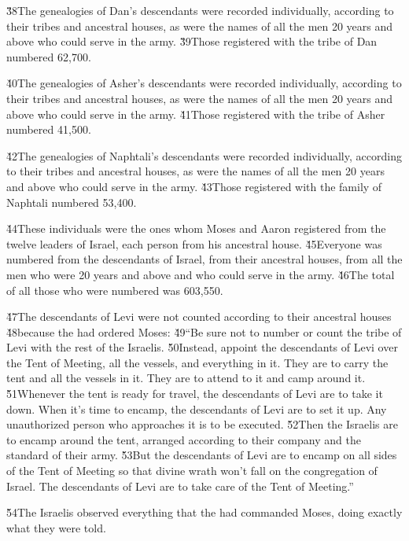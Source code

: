 \v{38}The genealogies of Dan's descendants were recorded individually, according to their tribes and ancestral houses, as were the names of all the men 20 years and above who could serve in the army. \v{39}Those registered with the tribe of Dan numbered 62,700.

\v{40}The genealogies of Asher's descendants were recorded individually, according to their tribes and ancestral houses, as were the names of all the men 20 years and above who could serve in the army. \v{41}Those registered with the tribe of Asher numbered 41,500.

\v{42}The genealogies of Naphtali's descendants were recorded individually, according to their tribes and ancestral houses, as were the names of all the men 20 years and above who could serve in the army. \v{43}Those registered with the family of Naphtali numbered 53,400.

\v{44}These individuals were the ones whom Moses and Aaron registered from the twelve leaders of Israel, each person from his ancestral house. \v{45}Everyone was numbered from the descendants of Israel, from their ancestral houses, from all the men who were 20 years and above and who could serve in the army. \v{46}The total of all those who were numbered was 603,550.

\v{47}The descendants of Levi were not counted according to their ancestral houses \v{48}because the  had ordered Moses: \v{49}``Be sure not to number or count the tribe of Levi with the rest of the Israelis. \v{50}Instead, appoint the descendants of Levi over the Tent of Meeting, all the vessels, and everything in it. They are to carry the tent and all the vessels in it. They are to attend to it and camp around it. \v{51}Whenever the tent is ready for travel, the descendants of Levi are to take it down. When it's time to encamp, the descendants of Levi are to set it up. Any unauthorized person who approaches it is to be executed. \v{52}Then the Israelis are to encamp around the tent, arranged according to their company and the standard of their army. \v{53}But the descendants of Levi are to encamp on all sides of the Tent of Meeting so that divine wrath won't fall on the congregation of Israel. The descendants of Levi are to take care of the Tent of Meeting.''

\v{54}The Israelis observed everything that the  had commanded Moses, doing exactly what they were told.

